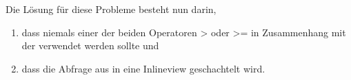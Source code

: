 \begin{center}
    \begin{small}
        \tablehead{}

        \begin{oraclesql}
            \begin{supertabular}{rr}

            \end{supertabular}
        \end{oraclesql}
    \end{small}
\end{center}
Die Lösung für diese Probleme besteht nun darin,
\begin{enumerate}
    \item dass niemals einer der beiden Operatoren \textgreater{} oder \textgreater = in Zusammenhang mit der  verwendet werden sollte und
    \item dass die Abfrage aus  in eine Inlineview geschachtelt wird.
\end{enumerate}

